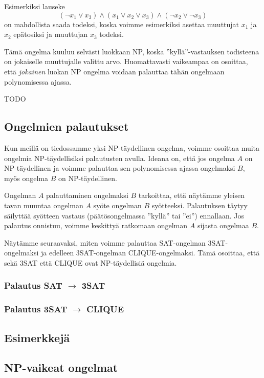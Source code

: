 Esimerkiksi lauseke
\[(\neg x_1 \lor x_3) \land (x_1 \lor x_2 \lor x_3) \land (\neg x_2 \lor \neg x_3)\]
on mahdollista saada todeksi, koska voimme esimerkiksi asettaa
muuttujat $x_1$ ja $x_2$ epätosiksi ja muuttujan $x_3$ todeksi.

Tämä ongelma kuuluu selvästi luokkaan NP, koska ''kyllä''-vastauksen
todisteena on jokaiselle muuttujalle valittu arvo.
Huomattavasti vaikeampaa on osoittaa, että \emph{jokainen} luokan
NP ongelma voidaan palauttaa tähän ongelmaan polynomisessa ajassa.

TODO

\subsection{Ongelmien palautukset}

Kun meillä on tiedossamme yksi NP-täydellinen ongelma,
voimme osoittaa muita ongelmia NP-täydellisiksi palautusten avulla.
Ideana on, että jos ongelma $A$ on NP-täydellinen ja
voimme palauttaa sen polynomisessa ajassa ongelmaksi $B$,
myös ongelma $B$ on NP-täydellinen.

Ongelman $A$ palauttaminen ongelmaksi $B$ tarkoittaa,
että näytämme yleisen tavan muuntaa ongelman $A$ syöte
ongelman $B$ syötteeksi.
Palautuksen täytyy säilyttää syötteen vastaus
(päätösongelmassa ''kyllä'' tai ''ei'') ennallaan.
Jos palautus onnistuu, voimme keskittyä ratkomaan ongelman
$A$ sijasta ongelmaa $B$.

Näytämme seuraavaksi, miten voimme palauttaa SAT-ongelman
3SAT-ongelmaksi ja edelleen 3SAT-ongelman CLIQUE-ongelmaksi.
Tämä osoittaa, että sekä 3SAT että CLIQUE
ovat NP-täydellisiä ongelmia.

\subsubsection{Palautus SAT $\rightarrow$ 3SAT}

\subsubsection{Palautus 3SAT $\rightarrow$ CLIQUE}

\subsection{Esimerkkejä}

\subsection{NP-vaikeat ongelmat}

